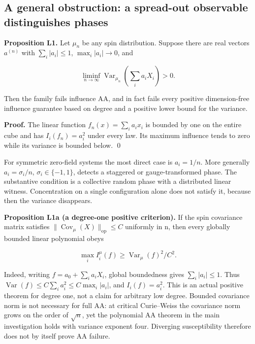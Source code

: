 \subsection{A general obstruction: a spread-out observable distinguishes
phases}\label{proof:local_interactions:a-general-obstruction-a-spread-out-observable-distinguishes-phases}

\textbf{Proposition L1.} Let \(\mu _n\) be any spin distribution.
Suppose there are real vectors \(a^{(n)}\) with \(\sum_i|a_i|\le 1\),
\(\max _i|a_i|\to 0\), and

\[
\liminf_{n\to\infty}\operatorname{Var}_{\mu_n}\left(\sum_i a_iX_i\right)>0.
\]

Then the family fails influence AA, and in fact fails every positive
dimension-free influence guarantee based on degree and a positive lower
bound for the variance.

\textbf{Proof.} The linear function \(f_n(x)=\sum_i a_ix_i\) is bounded
by one on the entire cube and has \(I_i(f_n)=a_i^{2}\) under every law.
Its maximum influence tends to zero while its variance is bounded below.
\qed

For symmetric zero-field systems the most direct case is \(a_i=1/n\).
More generally \(a_i=\sigma _i/n\), \(\sigma_i\in\{-1,1\}\), detects a
staggered or gauge-transformed phase. The substantive condition is a
collective random phase with a distributed linear witness. Concentration
on a single configuration alone does not satisfy it, because then the
variance disappears.

\textbf{Proposition L1a (a degree-one positive criterion).} If the spin
covariance matrix satisfies
\(\lVert \operatorname{Cov}_\mu (X)\rVert_{\mathrm{op}}\le C\) uniformly
in n, then every globally bounded linear polynomial obeys

\[
\max_i I_i^\mu(f)\ge \operatorname{Var}_\mu(f)^2/C^2.
\]

Indeed, writing \(f=a_{0}+\sum_i a_iX_i\), global boundedness gives
\(\sum_i|a_i|\le 1\). Thus
\(\operatorname{Var}(f)\le C\sum_i a_i^{2}\le C \max _i|a_i|\), and
\(I_i(f)=a_i^{2}\). This is an actual positive theorem for degree one,
not a claim for arbitrary low degree. Bounded covariance norm is not
necessary for full AA: at critical Curie--Weiss the covariance norm
grows on the order of \(\sqrt{n}\), yet the polynomial AA theorem in the
main investigation holds with variance exponent four. Diverging
susceptibility therefore does not by itself prove AA failure.

